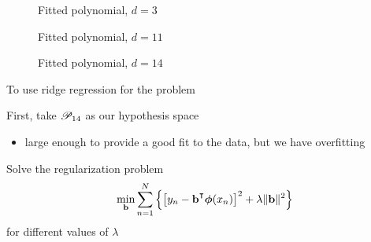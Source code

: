 \begin{frame}

    \begin{figure}
       \begin{center}
        \caption{\label{f:ofit3} Fitted polynomial, $d=3$}
       \end{center}
    \end{figure}
    
\end{frame}

\begin{frame}

    \begin{figure}
       \begin{center}
        \caption{\label{f:ofit11} Fitted polynomial, $d=11$}
       \end{center}
    \end{figure}
    
\end{frame}

\begin{frame}

    \begin{figure}
       \begin{center}
        \caption{\label{f:ofit14} Fitted polynomial, $d=14$}
       \end{center}
    \end{figure}
    
\end{frame}

\begin{frame}

    \vspace{2em}
    To use ridge regression for the problem
    
    First, take
    $\mathscr P_{14}$ as our hypothesis space
    \begin{itemize}
        \item large enough to
    provide a good fit to the data, but we have overfitting 
    \end{itemize}
    
    \vspace{.7em}
    Solve the regularization problem
    \begin{equation*}
        \min_{\boldb} \sum_{n=1}^N 
            \left\{
                \left[ y_n - \boldb^\T\boldphi(x_n) \right]^2 + \lambda \| \boldb \|^2
            \right\}
    \end{equation*}
    for different values of $\lambda$

\end{frame}

